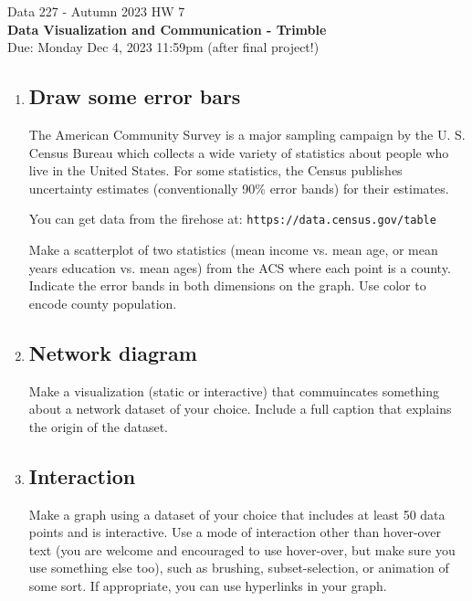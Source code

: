 \documentclass[]{book}
\theoremstyle{definition}
\begin{document}
\begin{center}
{\Large Data 227 - Autumn 2023 \hspace{0.5cm} HW 7}\\
\textbf{Data Visualization and Communication - Trimble}\\ %
Due: Monday Dec 4, 2023  11:59pm    (after final project!)
\end{center}

\vspace{0.2 cm}

\begin{enumerate}

\item
\subsection*{Draw some error bars }
The American Community Survey is a major sampling campaign by the U. S. Census Bureau which collects a wide variety of statistics about people who live in the United States.   For some statistics, the Census publishes uncertainty estimates (conventionally 90\% error bands) for their estimates.

You can get data from the firehose at:
\texttt{https://data.census.gov/table}

Make a scatterplot of two statistics (mean income vs. mean age, or mean years education vs. mean ages) from the ACS where each point is a county.  Indicate the error bands in both dimensions on the graph.  
Use color to encode county population. 


\item
\subsection*{Network diagram}
Make a visualization (static or interactive) that commuincates something about a network dataset of your choice.  Include a full caption that explains the origin of the dataset.

\item
\subsection*{Interaction}
Make a graph using a dataset of your choice that includes at least 50 data points and is interactive.  Use a mode of interaction other than hover-over text (you are welcome and encouraged to use hover-over, but make sure you use something else too), such as brushing, subset-selection, or animation of some sort.  If appropriate, you can use hyperlinks in your graph.


\end{enumerate}
\end{document}
